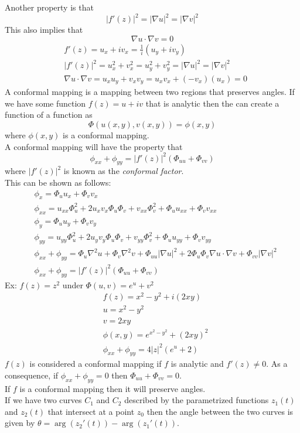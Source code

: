 Another property is that 
$$|f'(z)|^2=|\nabla u|^2=|\nabla v|^2$$
This also implies that
$$\nabla u\cdot \nabla v=0$$
\begin{align*}
    &f'(z)=u_x+iv_x=\frac{1}{i}(u_y+iv_y)\\
    &|f'(z)|^2=u_x^2+v_x^2=u_y^2+v_y^2=|\nabla u|^2=|\nabla v|^2\\
    &\nabla u\cdot \nabla v=u_xu_y+v_xv_y=u_xv_x+(-v_x)(u_x)=0
\end{align*}
A conformal mapping is a mapping between two regions that preserves angles. If we have some function $f(z)=u+iv$ that is analytic then the can create a function of a function as
\[\Phi(u(x,y),v(x,y))=\phi(x,y)\]
where $\phi(x,y)$ is a conformal mapping.\\
A conformal mapping will have the property that 
\[\phi_{xx}+\phi_{yy}=|f'(z)|^2(\Phi_{uu}+\Phi_{vv})\]
where $|f'(z)|^2$ is known as the \textit{conformal factor}.\\
This can be shown as follows:
\begin{align*}
    &\phi_x=\Phi_uu_x+\Phi_vv_x\\
    &\phi_{xx}=u_{xx}\Phi_u^2+2u_xv_x\Phi_u\Phi_v+v_{xx}\Phi_v^2+\Phi_uu_{xx}+\Phi_vv_{xx}\\
    &\phi_y=\Phi_uu_y+\Phi_vv_y\\
    &\phi_{yy}=u_{yy}\Phi_u^2+2u_yv_y\Phi_u\Phi_v+v_{yy}\Phi_v^2+\Phi_uu_{yy}+\Phi_vv_{yy}\\
    &\phi_{xx}+\phi_{yy}=\Phi_u\nabla^2u+\Phi_v\nabla^2v+\Phi_{uu}|\nabla u|^2+2\Phi_u\Phi_v\nabla u\cdot\nabla v+\Phi_{vv}|\nabla v|^2\\
    &\phi_{xx}+\phi_{yy}=|f'(z)|^2(\Phi_{uu}+\Phi_{vv})
\end{align*}
Ex: $f(z)=z^2$ under $\Phi(u,v)=e^u+v^2$
\begin{align*}
    &f(z)=x^2-y^2+i(2xy)\\
    &u=x^2-y^2\\
    &v=2xy\\
    &\phi(x,y)=e^{x^2-y^2}+(2xy)^2\\
    &\phi_{xx}+\phi_{yy}=4|z|^2(e^u+2)
\end{align*}
$f(z)$ is considered a conformal mapping if $f$ is analytic and $f'(z)\neq0$. As a consequence, if $\phi_{xx}+\phi_{yy}=0$ then $\Phi_{uu}+\Phi_{vv}=0$.\\
If $f$ is a conformal mapping then it will preserve angles.\\
If we have two curves $C_1$ and $C_2$ described by the parametrized functions $z_1(t)$ and $z_2(t)$ that intersect at a point $z_0$ then the angle between the two curves is given by $\theta=\arg(z_2'(t))-\arg(z_1'(t))$.\\
